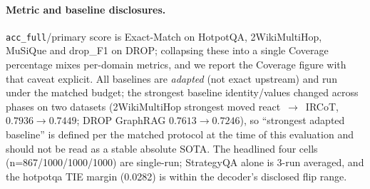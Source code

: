 \paragraph{Metric and baseline disclosures.}  \texttt{acc\_full}/primary
score is Exact-Match on HotpotQA, 2WikiMultiHop, MuSiQue and drop\_F1 on
DROP; collapsing these into a single Coverage percentage mixes per-domain
metrics, and we report the Coverage figure with that caveat explicit. All
baselines are \emph{adapted} (not exact upstream) and run under the matched
budget; the strongest baseline identity/values changed across phases on two
datasets (2WikiMultiHop strongest moved react~$\rightarrow$~IRCoT,
$0.7936\rightarrow0.7449$; DROP GraphRAG $0.7613\rightarrow0.7246$), so
``strongest adapted baseline'' is defined per the matched protocol at the
time of this evaluation and should not be read as a stable absolute SOTA.
The headlined four cells (n=867/1000/1000/1000) are single-run; StrategyQA
alone is 3-run averaged, and the hotpotqa TIE margin (0.0282) is within the
decoder's disclosed flip range.
